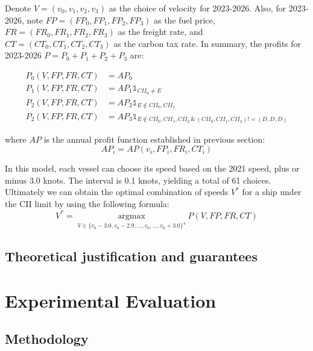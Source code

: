 \documentclass[a4paper,12pt]{article}
\begin{document}
Denote $V = (v_0, v_1, v_2, v_3)$ as the choice of velocity for 2023-2026.
Also, for 2023-2026, note $FP=(FP_0, FP_1,FP_2,FP_3)$ as the fuel price, $FR=(FR_0,FR_1,FR_2,FR_3)$ as the freight rate, and $CT=(CT_0, CT_1, CT_2, CT_3)$ as the carbon tax rate.
In summary, the profits for 2023-2026 $P=P_0+P_1+P_2+P_3$ are:

\begin{align}
	\label{eq:P}
	P_0(V, FP, FR, CT ) & = AP_0                                                                                   \\
	P_1(V, FP, FR, CT ) & = AP_1 \mathds{1} _{CII_0 \neq E}                                                        \\
	P_2(V, FP, FR, CT ) & = AP_2 \mathds{1} _{E \notin {CII_0, CII_1}}                                             \\
	P_2(V, FP, FR, CT ) & = AP_3 \mathds{1} _{E \notin {CII_0, CII_1, CII_2}\,\&\, (CII_0, CII_1, CII_2)!=(D,D,D)}
\end{align}

where $AP$ is the annual profit function established in previous section:
\begin{equation}
	AP_i = AP(v_i, FP_i, FR_i, CT_i)
\end{equation}

In this model, each vessel can choose its speed based on the 2021 speed, plus or minus 3.0 knots.
The interval is 0.1 knots, yielding a total of 61 choices.
Ultimately we can obtain the optimal combination of speeds $V^\ast$ for a ship under the CII limit by using the following formula:
\begin{equation}
	V^\ast = \operatorname*{argmax}_{V\in \{v_0-3.0, v_0-2.9, ..., v_0,...,v_0+3.0 \}^4} P(V, FP, FR, CT)
\end{equation}

\subsection{Theoretical justification and guarantees}

\section{Experimental Evaluation}
\subsection{Methodology}
\end{document}
